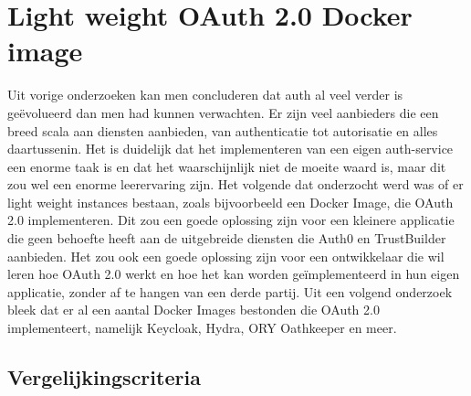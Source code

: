 \section{Light weight OAuth 2.0 Docker image}%
\label{sec:light-weight-oauth-2.0-docker-image}
Uit vorige onderzoeken kan men concluderen dat auth al veel verder is geëvolueerd dan men had kunnen verwachten. Er zijn veel aanbieders die een breed scala aan diensten aanbieden, van authenticatie tot autorisatie en alles daartussenin. Het is duidelijk dat het implementeren van een eigen auth-service een enorme taak is en dat het waarschijnlijk niet de moeite waard is, maar dit zou wel een enorme leerervaring zijn.
\newline
\newline
Het volgende dat onderzocht werd was of er light weight instances bestaan, zoals bijvoorbeeld een Docker Image, die OAuth 2.0 implementeren. Dit zou een goede oplossing zijn voor een kleinere applicatie die geen behoefte heeft aan de uitgebreide diensten die Auth0 en TrustBuilder aanbieden. Het zou ook een goede oplossing zijn voor een ontwikkelaar die wil leren hoe OAuth 2.0 werkt en hoe het kan worden geïmplementeerd in hun eigen applicatie, zonder af te hangen van een derde partij.
\newline
\newline
Uit een volgend onderzoek bleek dat er al een aantal Docker Images bestonden die OAuth 2.0 implementeert, namelijk Keycloak, Hydra, ORY Oathkeeper en meer.


\subsection{Vergelijkingscriteria}%
\label{subsec:vergelijkingscriteria}

